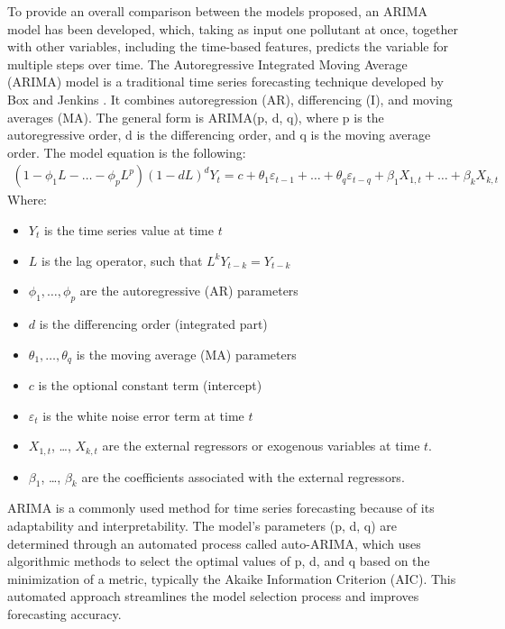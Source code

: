 To provide an overall comparison between the models proposed, an ARIMA model has been developed, which, taking as input one pollutant at once, together with other variables, including the time-based features, predicts the variable for multiple steps over time. 
The Autoregressive Integrated Moving Average (ARIMA) model is a traditional time series forecasting technique developed by Box and Jenkins \cite{box1970time}. It combines autoregression (AR), differencing (I), and moving averages (MA). The general form is ARIMA(p, d, q), where p is the autoregressive order, d is the differencing order, and q is the moving average order. The model equation is the following:
\begin{align*}
(1 - \phi_1 L - \dots - \phi_p L^p)(1 - dL)^d Y_t = c + \theta_1 \varepsilon_{t-1} + \dots + \theta_q \varepsilon_{t-q} + \beta_1 X_{1,t} + \dots + \beta_k X_{k,t}
\end{align*}
Where: 
\begin{itemize}[leftmargin=*, noitemsep]
    \item[] $Y_t$ is the time series value at time $t$
    \item[] $L$ is the lag operator, such that $L^k Y_{t-k} = Y_{t-k}$ 
    \item[] $\phi_1, \dots ,  \phi_p$ are the autoregressive (AR) parameters
    \item[] $d$ is the differencing order (integrated part)
    \item[] $\theta_1, \dots , \theta_q$ is the  moving average (MA) parameters
    \item[] $c$ is the optional constant term (intercept)
    \item[] $\varepsilon_t$ is the white noise error term at time $t$
    \item[] $X_{1,t}$, \dots, $X_{k,t}$ are  the external regressors or exogenous variables at time $t$. 
    \item[] $\beta_1$, \dots, $\beta_k$ are the coefficients associated with the external regressors.
\end{itemize}



ARIMA is a commonly used method for time series forecasting because of its adaptability and interpretability. The model's parameters (p, d, q) are determined through an automated process called auto-ARIMA, which uses algorithmic methods to select the optimal values of p, d, and q based on the minimization of a metric, typically the Akaike Information Criterion (AIC). This automated approach streamlines the model selection process and improves forecasting accuracy.

